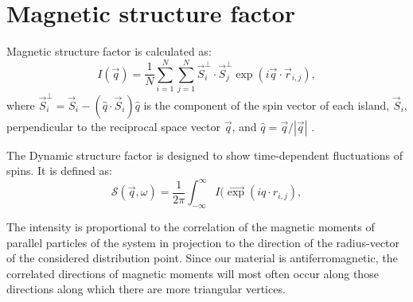 \documentclass[pre,reprint,superscriptaddress]{revtex4-2}
\begin{document}
\section{Magnetic structure factor}

Magnetic structure factor is calculated as:
\begin{equation}
  I(\vec{q}) = \frac{1}{N} \sum^N_{i=1} \sum^N_{j=1} \vec{S}_i^\perp \cdot \vec{S}_j^\perp \exp (i \vec{q} \cdot \vec{r}_{i,j}),
\end{equation}
where $\vec{S}_i^\perp = \vec{S}_i - (\hat{q} \cdot \vec{S}_i ) \hat{q}$ is the component of the spin vector of each island, $\vec{S}_i$, perpendicular to the reciprocal space vector $\vec{q}$, and $\hat{q} = \vec{q} / |\vec{q}|$ \cite{Farhan2019}. 

The Dynamic structure factor is designed to show time-dependent fluctuations of spins. It is defined as:
\begin{equation}
	\mathcal{S} (\vec{q},\omega) = \frac{1}{2 \pi} \int_{-\infty}^{\infty}  I(\vec \exp (iq \cdot r_{i,j}),
\end{equation}

The intensity is proportional to the correlation of the magnetic moments of parallel particles of the system in projection to the direction of the radius-vector of the considered distribution point. Since our material is antiferromagnetic, the correlated directions of magnetic moments will most often occur along those directions along which there are more triangular vertices.
\end{document}
